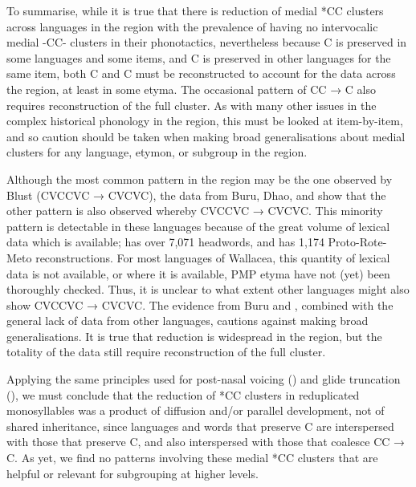 To summarise, while it is true that there is reduction of  medial
*CC clusters across languages in the region with the prevalence
of having no intervocalic medial -CC- clusters in their phonotactics,
nevertheless because C is preserved in some languages
and some items, and C is preserved in other languages
for the same item,
both C and C must be reconstructed to account for
the data across the region,
at least in some etyma.
The occasional pattern of CC → C also requires
reconstruction of the full cluster.
As with many other issues in the complex historical phonology
in the region, this must be looked at item-by-item,
and so caution should be taken when making broad generalisations
about medial clusters for any language,
etymon, or subgroup in the region.

Although the most common pattern in the region may be the one
observed by Blust (CVCCVC → CVCVC),
the data from Buru,
Dhao, and  show that the other pattern is also
observed whereby CVCCVC → CVCVC.
This minority pattern is detectable in these languages because
of the great volume of lexical data which is available; \citet{GrimesGrimes2020}
has over 7,071 headwords,
and \citet{Edwards2021} has 1,174 Proto-Rote-Meto reconstructions.
For most languages of Wallacea,
this quantity of lexical data is not available,
or where it is available,
PMP etyma have not (yet) been thoroughly checked.
Thus, it is unclear to what extent other languages might also
show CVCCVC → CVCVC.
The evidence from Buru
and , combined with the general lack of data from
other languages, cautions against making broad generalisations.
It is true that reduction is widespread in the region,
but the totality of the data still require reconstruction of the full cluster.

Applying the same principles used for post-nasal voicing ()
and glide truncation (),
we must conclude that the reduction of *CC clusters in reduplicated
monosyllables was a product of diffusion and/or parallel development,
not of shared inheritance,
since languages and words that preserve C are interspersed
with those that preserve C,
and also interspersed with those that coalesce CC → C.
As yet, we find no patterns involving these medial *CC clusters
that are helpful or relevant for subgrouping at higher levels.
